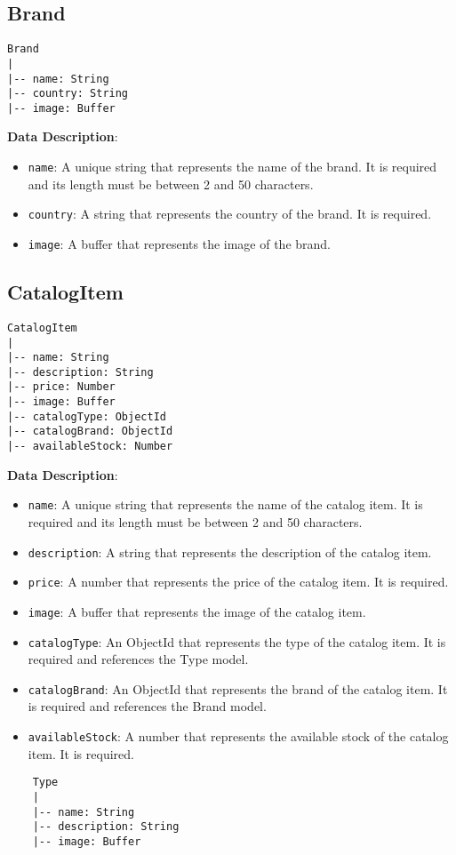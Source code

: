 \subsection{Brand}

\begin{verbatim}
Brand
|
|-- name: String
|-- country: String
|-- image: Buffer
\end{verbatim}

\textbf{Data Description}:

\begin{itemize}
    \item \texttt{name}: A unique string that represents the name of the brand. It is required and its length must be between 2 and 50 characters.
    \item \texttt{country}: A string that represents the country of the brand. It is required.
    \item \texttt{image}: A buffer that represents the image of the brand.
\end{itemize}

\subsection{CatalogItem}

\begin{verbatim}
CatalogItem
|
|-- name: String
|-- description: String
|-- price: Number
|-- image: Buffer
|-- catalogType: ObjectId
|-- catalogBrand: ObjectId
|-- availableStock: Number
\end{verbatim}

\textbf{Data Description}:

\begin{itemize}
    \item \texttt{name}: A unique string that represents the name of the catalog item. It is required and its length must be between 2 and 50 characters.
    \item \texttt{description}: A string that represents the description of the catalog item.
    \item \texttt{price}: A number that represents the price of the catalog item. It is required.
    \item \texttt{image}: A buffer that represents the image of the catalog item.
    \item \texttt{catalogType}: An ObjectId that represents the type of the catalog item. It is required and references the Type model.
    \item \texttt{catalogBrand}: An ObjectId that represents the brand of the catalog item. It is required and references the Brand model.
    \item \texttt{availableStock}: A number that represents the available stock of the catalog item. It is required.
\end{itemize}
\begin{verbatim}
    Type
    |
    |-- name: String
    |-- description: String
    |-- image: Buffer
    \end{verbatim}

